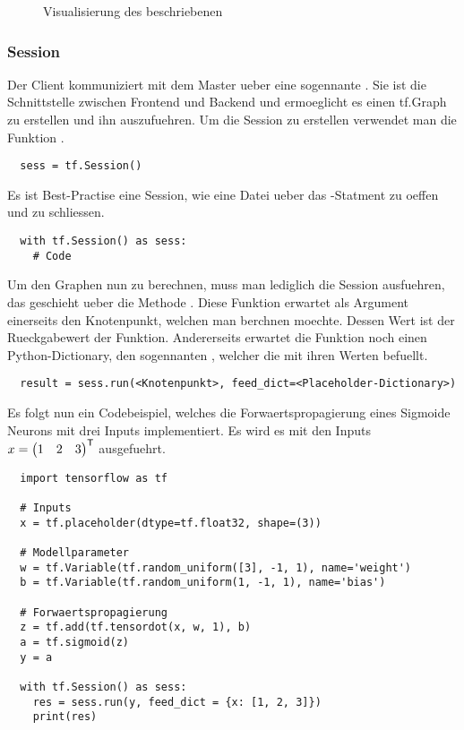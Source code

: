 \begin{figure}
  \caption{Visualisierung des beschriebenen }
\end{figure}
\para{}


\subsubsection{Session}
Der Client kommuniziert mit dem Master ueber eine sogennante
.
Sie ist die Schnittstelle zwischen Frontend und Backend und ermoeglicht es einen tf.Graph
zu erstellen und ihn auszufuehren.
Um die Session zu erstellen verwendet man die Funktion .
\begin{verbatim}
  sess = tf.Session()
\end{verbatim}
Es ist Best-Practise eine Session, wie eine Datei ueber das
-Statment zu oeffen und zu schliessen.
\begin{verbatim}
  with tf.Session() as sess:
    # Code
\end{verbatim}
\para{}
Um den Graphen nun zu berechnen, muss man lediglich die Session ausfuehren, das
geschieht ueber die Methode .
Diese Funktion erwartet als Argument einerseits den Knotenpunkt, welchen man
berchnen moechte. Dessen Wert ist der Rueckgabewert der Funktion.
Andererseits erwartet die Funktion noch einen Python-Dictionary, den sogennanten
, welcher die  mit ihren Werten befuellt.
\begin{verbatim}
  result = sess.run(<Knotenpunkt>, feed_dict=<Placeholder-Dictionary>)
\end{verbatim}
Es folgt nun ein Codebeispiel, welches die Forwaertspropagierung eines
Sigmoide Neurons mit drei Inputs implementiert. Es wird es mit den Inputs $x = \begin{pmatrix}1&2&3\end{pmatrix}^{\mathsf{T}}$ ausgefuehrt.
\begin{verbatim}
  import tensorflow as tf

  # Inputs
  x = tf.placeholder(dtype=tf.float32, shape=(3))

  # Modellparameter
  w = tf.Variable(tf.random_uniform([3], -1, 1), name='weight')
  b = tf.Variable(tf.random_uniform(1, -1, 1), name='bias')

  # Forwaertspropagierung
  z = tf.add(tf.tensordot(x, w, 1), b)
  a = tf.sigmoid(z)
  y = a

  with tf.Session() as sess:
    res = sess.run(y, feed_dict = {x: [1, 2, 3]})
    print(res)
\end{verbatim}

